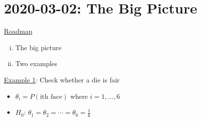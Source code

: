 \section{2020-03-02: The Big Picture}
\underline{Roadmap}
\begin{enumerate}[(i)]
    \item The big picture
    \item Two examples
\end{enumerate}
\underline{Example 1}: Check whether a die is fair
\begin{itemize}
    \item $ \theta_i=P(\text{ith face}) $ where $ i=1,\ldots ,6 $
    \item $ H_0 $: $ \theta_1=\theta_2=\cdots=\theta_6=\frac{1}{6} $
\end{itemize}
